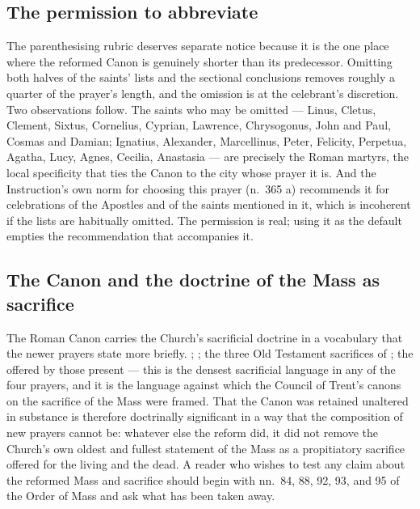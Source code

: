 \subsection{The permission to abbreviate}

The parenthesising rubric deserves separate notice because it is the one place where the
reformed Canon is genuinely shorter than its predecessor. Omitting both halves of the saints'
lists and the sectional  conclusions removes roughly a
quarter of the prayer's length, and the omission is at the celebrant's discretion. Two
observations follow. The saints who may be omitted --- Linus, Cletus, Clement, Sixtus,
Cornelius, Cyprian, Lawrence, Chrysogonus, John and Paul, Cosmas and Damian; Ignatius,
Alexander, Marcellinus, Peter, Felicity, Perpetua, Agatha, Lucy, Agnes, Cecilia, Anastasia ---
are precisely the Roman martyrs, the local specificity that ties the Canon to the city whose
prayer it is. And the Instruction's own norm for choosing this prayer (n.\ 365 a) recommends it
for celebrations of the Apostles and of the saints mentioned in it, which is incoherent if the
lists are habitually omitted. The permission is real; using it as the default empties the
recommendation that accompanies it.

\subsection{The Canon and the doctrine of the Mass as sacrifice}

The Roman Canon carries the Church's sacrificial doctrine in a vocabulary that the newer prayers
state more briefly. ;
; the three Old Testament sacrifices
of ; the  offered by those present --- this is the
densest sacrificial language in any of the four prayers, and it is the language against which
the Council of Trent's canons on the sacrifice of the Mass were framed. That the Canon was
retained unaltered in substance is therefore doctrinally significant in a way that the
composition of new prayers cannot be: whatever else the reform did, it did not remove the
Church's own oldest and fullest statement of the Mass as a propitiatory sacrifice offered for
the living and the dead. A reader who wishes to test any claim about the reformed Mass and
sacrifice should begin with nn.\ 84, 88, 92, 93, and 95 of the Order of Mass and ask what has
been taken away.
